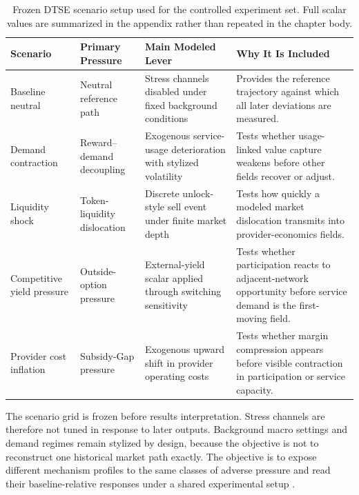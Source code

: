 \begin{table}[H]
    \centering
    \small
    \renewcommand{\arraystretch}{1.2}
    \begin{tabularx}{\textwidth}{@{}>{\raggedright\arraybackslash}p{}>{\raggedright\arraybackslash}p{}>{\raggedright\arraybackslash}p{}X@{}}
        \toprule
        \textbf{Scenario} & \textbf{Primary Pressure} & \textbf{Main Modeled Lever} & \textbf{Why It Is Included} \\
        \midrule
        Baseline neutral & Neutral reference path & Stress channels disabled under fixed background conditions & Provides the reference trajectory against which all later deviations are measured. \\
        \addlinespace
        Demand contraction & Reward--demand decoupling & Exogenous service-usage deterioration with stylized volatility & Tests whether usage-linked value capture weakens before other fields recover or adjust. \\
        \addlinespace
        Liquidity shock & Token-liquidity dislocation & Discrete unlock-style sell event under finite market depth & Tests how quickly a modeled market dislocation transmits into provider-economics fields. \\
        \addlinespace
        Competitive yield pressure & Outside-option pressure & External-yield scalar applied through switching sensitivity & Tests whether participation reacts to adjacent-network opportunity before service demand is the first-moving field. \\
        \addlinespace
        Provider cost inflation & Subsidy-Gap pressure & Exogenous upward shift in provider operating costs & Tests whether margin compression appears before visible contraction in participation or service capacity. \\
        \bottomrule
    \end{tabularx}
    \caption[DTSE scenario setup]{Frozen DTSE scenario setup used for the controlled experiment set. Full scalar values are summarized in the appendix rather than repeated in the chapter body.}
    \label{tab:dtse_scenario_contract}
\end{table}

The scenario grid is frozen before results interpretation. Stress channels are therefore not tuned in response to later outputs. Background macro settings and demand regimes remain stylized by design, because the objective is not to reconstruct one historical market path exactly. The objective is to expose different mechanism profiles to the same classes of adverse pressure and read their baseline-relative responses under a shared experimental setup \cite{Morris2019}.

